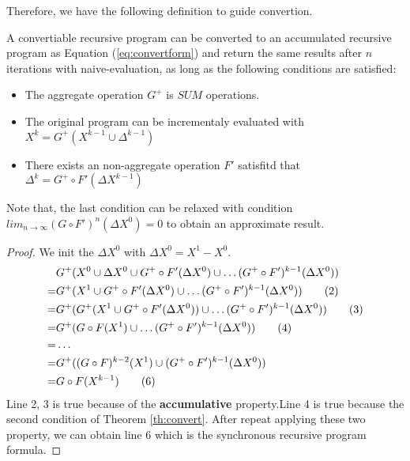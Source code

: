 Therefore, we have the following definition to guide convertion.
\begin{definition}
	\label{th:convert}
	 A convertiable recursive program can be converted to an accumulated recursive program as Equation (\ref{eq:convertform}) and return the same results after $n$ iterations with naive-evaluation, as long as the following conditions are satisfied:
	\begin{itemize}
		\item The aggregate operation $G^+$ is $SUM$ operations.
		\item The original program can be incrementaly evaluated with $X^{k}=G^+(X^{k-1}\cup \Delta^{k-1})$
	\item There exists an non-aggregate operation $F'$ satisfitd that $\Delta^{k}=G^+\circ F'(\Delta X^{k-1})$
		
		
	\end{itemize}
\end{definition}
{\color{green}
Note that, the last condition can be relaxed with condition $lim_{n\rightarrow\infty}(G\circ F')^n(\Delta X^0)=0$ to obtain an approximate result.
}
 \begin{proof}
 	We init the $\Delta X^0$ with $\Delta X^0=X^1-X^0$.
 	\begin{align}
 	&G^+(X^0\cup \Delta X^0 \cup G^+\circ F'(\Delta X^0)\cup \ldots (G^+ \circ F')^{k-1}(\Delta X^0 )) \notag\\
 	=&G^+(X^1 \cup G^+\circ F'(\Delta X^0  )\cup \ldots (G^+ \circ F')^{k-1}(\Delta X^0  )) \tag{2}\\
 	=&G^+(G^+(X^1\cup G^+\circ F'(\Delta X^0  ))\cup \ldots (G^+ \circ F')^{k-1}(\Delta X^0 )) \tag{3}\\
 	=&G^+(G\circ F(X^1)\cup \ldots (G^+ \circ F')^{k-1}(\Delta X^0 )) \tag{4}\\
 	=&\ldots \notag\\
 	=&G^+((G\circ F)^{k-2}(X^1)\cup(G^+ \circ F')^{k-1}(\Delta X^0 )) \notag\\
 	=&G\circ F(X^{k-1})\tag{6}
 	\end{align}
 	Line 2, 3 is true because of the \textbf{accumulative} property.Line 4 is true because the second condition of Theorem \ref{th:convert}. After repeat applying these two property, we can obtain line 6 which is the synchronous recursive program formula. 
 \end{proof}


